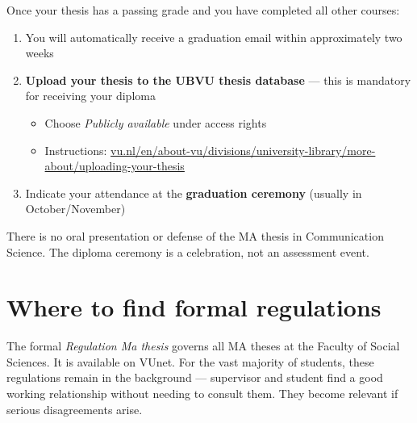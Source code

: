 \documentclass[
  11pt,
  a4paper,
]{scrbook}
\providecommand{\tightlist}{%
  \setlength{\itemsep}{0pt}\setlength{\parskip}{0pt}}\usepackage{longtable,booktabs,array}
\begin{document}
Once your thesis has a passing grade and you have completed all other
courses:

\begin{enumerate}
\def\labelenumi{\arabic{enumi}.}
\tightlist
\item
  You will automatically receive a graduation email within approximately
  two weeks
\item
  \textbf{Upload your thesis to the UBVU thesis database} --- this is
  mandatory for receiving your diploma

  \begin{itemize}
  \tightlist
  \item
    Choose \emph{Publicly available} under access rights
  \item
    Instructions:
    \href{https://vu.nl/en/about-vu/divisions/university-library/more-about/uploading-your-thesis}{vu.nl/en/about-vu/divisions/university-library/more-about/uploading-your-thesis}
  \end{itemize}
\item
  Indicate your attendance at the \textbf{graduation ceremony} (usually
  in October/November)
\end{enumerate}

\begin{tcolorbox}[enhanced jigsaw, bottomrule=.15mm, opacityback=0, toprule=.15mm, colframe=quarto-callout-note-color-frame, left=2mm, rightrule=.15mm, title=\textcolor{quarto-callout-note-color}{\faInfo}\hspace{0.5em}{No defense required}, colbacktitle=quarto-callout-note-color!10!white, bottomtitle=1mm, colback=white, breakable, toptitle=1mm, titlerule=0mm, leftrule=.75mm, arc=.35mm, opacitybacktitle=0.6, coltitle=black]

There is no oral presentation or defense of the MA thesis in
Communication Science. The diploma ceremony is a celebration, not an
assessment event.

\end{tcolorbox}

\section{Where to find formal
regulations}\label{where-to-find-formal-regulations}

The formal \emph{Regulation Ma thesis} governs all MA theses at the
Faculty of Social Sciences. It is available on VUnet. For the vast
majority of students, these regulations remain in the background ---
supervisor and student find a good working relationship without needing
to consult them. They become relevant if serious disagreements arise.
\end{document}
